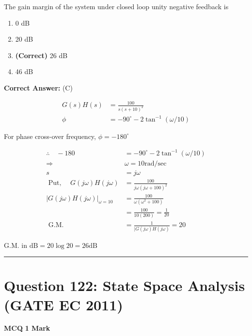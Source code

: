 \documentclass[11pt,a4paper]{article}
\begin{document}
The gain margin of the system under closed loop unity negative feedback is


\begin{enumerate}[label=(\Alph*)]
    \item 0 dB
    \item 20 dB
    \item \textbf{(Correct)} 26 dB
    \item 46 dB
\end{enumerate}

\noindent \textbf{Correct Answer:} (C)

\begin{tcolorbox}[solbox, title=Detailed Solution -- Question 121]
\[
\begin{aligned} G(s) H(s) &=\frac{100}{s(s+10)^{2}} \\ \phi &=-90^{\circ}-2 \tan ^{-1}(\omega / 10) \end{aligned}
\]

 For phase cross-over frequency, $\phi=-180^{\circ}$

\[
\begin{aligned} \therefore \quad-180 &=-90^{\circ}-2 \tan ^{-1}(\omega / 10) \\ \Rightarrow & \omega=10 \mathrm{rad} / \mathrm{sec} \\ s &=j \omega \\ \text { Put, } \quad G(j \omega) H(j \omega) &=\frac{100}{j \omega(j \omega+100)^{2}} \\ |G(j \omega) H(j \omega)|_{\omega=10} &=\frac{100}{\omega\left(\omega^{2}+100\right)} \\ &=\frac{100}{10(200)}=\frac{1}{20} \\ \text { G.M. } &=\frac{1}{\mid G(j \omega) H(j \omega)}=20 \end{aligned}
\]

 G.M. in $\mathrm{dB}=20 \log 20=26 \mathrm{dB}$
\end{tcolorbox}

\vspace{1.5em}
\hrule
\vspace{1.5em}

\section*{Question 122: State Space Analysis (GATE EC 2011)}
\noindent \textbf{\color{primary}MCQ} \hfill \textbf{\color{secondary}1 Mark}
\end{document}

